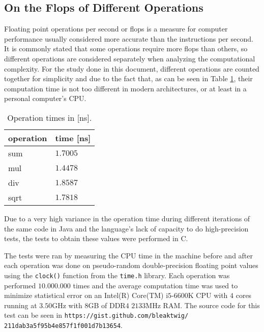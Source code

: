 \subsection{On the Flops of Different Operations} \label{add:flops}
Floating point operations per second or flops is a measure for computer performance usually considered more accurate than the instructions per second. %
It is commonly stated that some operations require more flops than others, so different operations are considered separately when analyzing the computational complexity.
For the study done in this document, different operations are counted together for simplicity and due to the fact that, as can be seen in Table \ref{tab:op_times}, their computation time is not too different in modern architectures, or at least in a personal computer's CPU.

    \begin{table}[h]
        \centering
        \begin{tabular}{@{}ll@{}}
        \toprule
        operation & time {[}ns{]} \\ \midrule
        sum       & $1.7005$   \\
        mul       & $1.4478$   \\
        div       & $1.8587$   \\
        sqrt      & $1.7818$   \\ \bottomrule
        \end{tabular}
        \caption{\label{tab:op_times} Operation times in [ns].}
    \end{table}

Due to a very high variance in the operation time during different iterations of the same code in Java and the language's lack of capacity to do high-precision tests, the tests to obtain these values were performed in C.

The tests were ran by measuring the CPU time in the machine before and after each operation was done on pseudo-random double-precision floating point values using the \texttt{clock()} function from the \texttt{time.h} library.
Each operation was performed $10.000.000$ times and the average computation time was used to minimize statistical error on an Intel(R) Core(TM) i$5$-$6600$K CPU with $4$ cores running at $3.50$GHz with $8$GB of DDR$4$ $2133$MHz RAM.
The source code for this test can be seen in \texttt{https://gist.github.com/bleaktwig/} \texttt{211dab3a5f95b4e857f1f001d7b13654}.